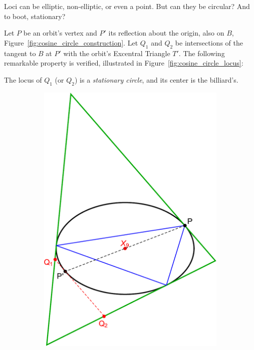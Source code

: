 Loci can be elliptic, non-elliptic, or even a point. But can they be circular? And to boot, stationary?

Let $P$ be an orbit's vertex and $P'$ its reflection about the origin, also on $B$, 
Figure~\ref{fig:cosine_circle_construction}. Let  $Q_1$ and $Q_2$ be intersections of the tangent to $B$ at $P'$ with the orbit's Excentral Triangle $T'$. The following remarkable property is verified, illustrated in Figure~\ref{fig:cosine_circle_locus}: 


\begin{theorem}
The locus of $Q_1$ (or $Q_2$) is a {\em stationary circle}, and its center is the billiard's.
\end{theorem}

\begin{figure}[H]
     \centering
     \begin{subfigure}[t]{0.45\textwidth}
         \centering
         \includegraphics[width=1.0\linewidth]{pics/0100_cosine_circle_construction.pdf}

\end{subfigure}
\end{figure}
